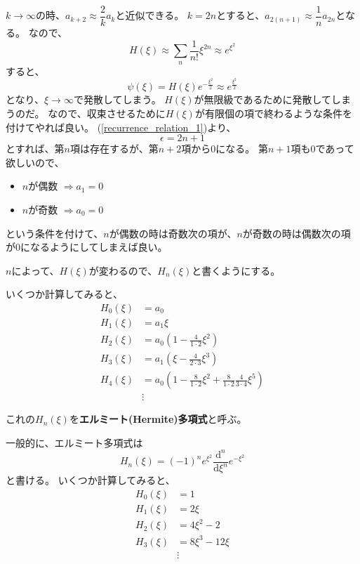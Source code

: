 $k \to \infty$の時、$a_{k+2} \approx \dfrac{2}{k}a_k$と近似できる。
$k = 2n$とすると、$a_{2(n+1)} \approx \dfrac{1}{n}a_{2n}$となる。
なので、
\begin{equation}
  H(\xi) \approx \sum_{n}\dfrac{1}{n!}\xi^{2n} \approx e^{\xi^2}
\end{equation}
すると、
\begin{equation}
  \psi(\xi) = H(\xi)e^{-\frac{\xi^2}{2}} \approx e^{\frac{\xi^2}{2}}
\end{equation}
となり、$\xi \to \infty$で発散してしまう。
$H(\xi)$が無限級であるために発散してしまうのだ。
なので、収束させるために$H(\xi)$が有限個の項で終わるような条件を付けてやれば良い。
(\ref{recurrence_relation_1})より、
\begin{equation}
  \label{eps_requirement}
  \epsilon = 2n + 1
\end{equation}
とすれば、第$n$項は存在するが、第$n+2$項から$0$になる。
第$n+1$項も$0$であって欲しいので、
\begin{itemize}
\item $n$が偶数 $\Rightarrow a_1 = 0$
\item $n$が奇数 $\Rightarrow a_0 = 0$
\end{itemize}
という条件を付けて、$n$が偶数の時は奇数次の項が、$n$が奇数の時は偶数次の項が$0$になるようにしてしまえば良い。

$n$によって、$H(\xi)$が変わるので、$H_n(\xi)$と書くようにする。

いくつか計算してみると、
$$
\begin{aligned} H_{0}(\xi) &=a_{0} \\ H_{1}(\xi) &=a_{1} \xi \\ H_{2}(\xi) &=a_{0}\left(1-\frac{4}{1 \cdot 2} \xi^{2}\right) \\ H_{3}(\xi) &=a_{1}\left(\xi-\frac{4}{2 \cdot 3} \xi^{3}\right) \\ H_{4}(\xi) &=a_{0}\left(1-\frac{8}{1 \cdot 2} \xi^{2}+\frac{8}{1 \cdot 2} \frac{4}{3 \cdot 4} \xi^{5}\right) \\ & \vdots
\end{aligned}
$$

これの$H_n(\xi)$を{\bf エルミート(Hermite)多項式}と呼ぶ。

一般的に、エルミート多項式は
\begin{equation}
  H_{n}(\xi)=(-1)^{n} e^{\xi^{2}} \frac{\mathrm{d}^{n}}{\mathrm{d} \xi^{n}} e^{-\xi^{2}}
\end{equation}
と書ける。
いくつか計算してみると、
\begin{equation}
  \begin{aligned}
    H_{0}(\xi) &= 1 \\
    H_{1}(\xi) &= 2 \xi \\
    H_{2}(\xi) &= 4 \xi^{2}-2 \\
    H_{3}(\xi) &= 8 \xi^{3}-12 \xi \\
    & \vdots \end{aligned}
\end{equation}

